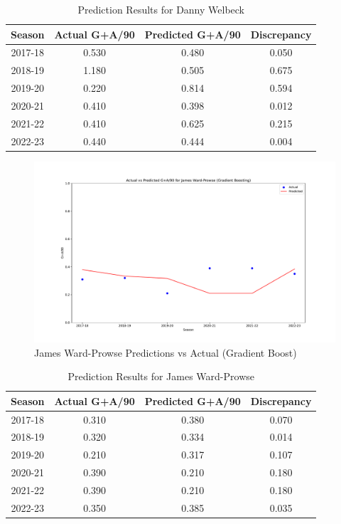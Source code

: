 \documentclass[12pt]{article}
\begin{document}


    \begin{table}[H]
      \centering
      \begin{tabular}{|c|c|c|c|}
      \hline
      \textbf{Season} & \textbf{Actual G+A/90} & \textbf{Predicted G+A/90} & \textbf{Discrepancy} \\
      \hline
      2017-18 & 0.530 & 0.480 & 0.050 \\
      2018-19 & 1.180 & 0.505 & 0.675 \\
      2019-20 & 0.220 & 0.814 & 0.594 \\
      2020-21 & 0.410 & 0.398 & 0.012 \\
      2021-22 & 0.410 & 0.625 & 0.215 \\
      2022-23 & 0.440 & 0.444 & 0.004 \\
      \hline
      \end{tabular}
      \caption{Prediction Results for Danny Welbeck}
      \label{tab:welbeck_prediction_results}
    \end{table}
    
  
\begin{figure}[H]
  \centering
  \includegraphics[width=1\textwidth]{GradBoost_Prowse.pdf}
  \caption{James Ward-Prowse Predictions vs Actual (Gradient Boost)}
  \label{fig:Prowse_graph}
  \end{figure}


\begin{table}[h]
  \centering
  \begin{tabular}{|c|c|c|c|}
  \hline
  \textbf{Season} & \textbf{Actual G+A/90} & \textbf{Predicted G+A/90} & \textbf{Discrepancy} \\
  \hline
  2017-18 & 0.310 & 0.380 & 0.070 \\
  2018-19 & 0.320 & 0.334 & 0.014 \\
  2019-20 & 0.210 & 0.317 & 0.107 \\
  2020-21 & 0.390 & 0.210 & 0.180 \\
  2021-22 & 0.390 & 0.210 & 0.180 \\
  2022-23 & 0.350 & 0.385 & 0.035 \\
  \hline
  \end{tabular}
  \caption{Prediction Results for James Ward-Prowse}
  \label{tab:wardprowse_prediction_results}
\end{table}
\end{document}
